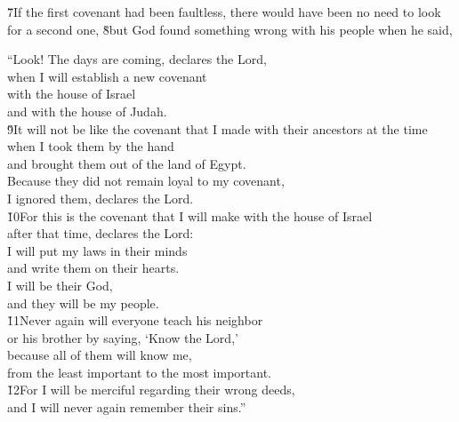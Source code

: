 \v{7}If the first covenant had been faultless, there would have been no need to look for a second one, \v{8}but God found something wrong with his people when he said,

\begin{poetry}
\poeml ``Look! The days are coming, declares the Lord, \\
\poemll    when I will establish a new covenant \\
\poemlll       with the house of Israel \\
\poemlll       and with the house of Judah. \\
\poeml \v{9}It will not be like the covenant that I made with their ancestors at the time \\
\poemll    when I took them by the hand \\
\poemlll       and brought them out of the land of Egypt. \\
\poeml Because they did not remain loyal to my covenant, \\
\poemll    I ignored them, declares the Lord. \\
\poeml \v{10}For this is the covenant that I will make with the house of Israel \\
\poemll    after that time, declares the Lord: \\
\poeml I will put my laws in their minds \\
\poemll    and write them on their hearts. \\
\poeml I will be their God, \\
\poemll    and they will be my people. \\
\poeml \v{11}Never again will everyone teach his neighbor \\
\poemll    or his brother by saying, `Know the Lord,' \\
\poeml because all of them will know me, \\
\poemll    from the least important to the most important. \\
\poeml \v{12}For I will be merciful regarding their wrong deeds, \\
\poemll    and I will never again remember their sins.''
\end{poetry}


